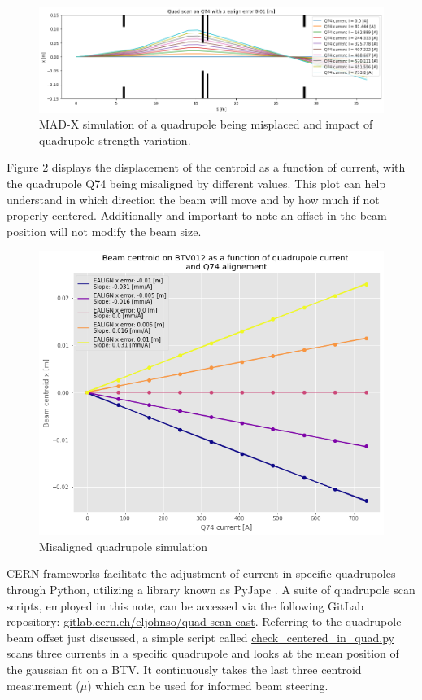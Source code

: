 \begin{figure}[htbp]
\centering
\includegraphics[width=\linewidth]{03_Empirical_Measurements/images/misaligned_quadrupole.png}
\caption{MAD-X simulation of a quadrupole being misplaced and impact of quadrupole strength variation.}
\label{fig:misaligned_quadrupole}
\end{figure}

Figure \ref{fig:misaligned_quadrupole_2} displays the displacement of the centroid as a function of current, with the quadrupole Q74 being misaligned by different values. This plot can help understand in which direction the beam will move and by how much if not properly centered. Additionally and important to note an offset in the beam position will not modify the beam size.
\\

\begin{figure}[htbp]
\centering
\includegraphics[width=0.7\linewidth]{03_Empirical_Measurements/images/misaligned_quadrupole_2.png}
\caption{Misaligned quadrupole simulation}
\label{fig:misaligned_quadrupole_2}
\end{figure}

CERN frameworks facilitate the adjustment of current in specific quadrupoles through Python, utilizing a library known as PyJapc \cite{noauthor_scripting-tools_2023}. A suite of quadrupole scan scripts, employed in this note, can be accessed via the following GitLab repository:  \href{https://gitlab.cern.ch/eljohnso/quad-scan-east}{gitlab.cern.ch/eljohnso/quad-scan-east}. Referring to the quadrupole beam offset just discussed, a simple script called \href{https://gitlab.cern.ch/eljohnso/quad-scan-east/-/blob/master/check_centered_in_quad.py}{check\_centered\_in\_quad.py} scans three currents in a specific quadrupole and looks at the mean position of the gaussian fit on a BTV. It continuously takes the last three centroid measurement ($\mu$) which can be used for informed beam steering.

